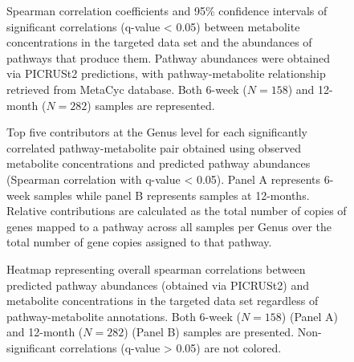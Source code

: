 \begin{figure}[!h]
    \centering
    \caption[Spearman correlation coefficients and 95\% confidence intervals of significant correlations (q-value < 0.05) between metabolite concentrations in the targeted data set and the abundances of pathways that produce them]{Spearman correlation coefficients and 95\% confidence intervals of significant correlations (q-value < 0.05) between metabolite concentrations in the targeted data set and the abundances of pathways that produce them. Pathway abundances were obtained via PICRUSt2 predictions, with pathway-metabolite relationship retrieved from MetaCyc database. Both 6-week ($N = 158$) and 12-month ($N = 282$) samples are represented.}
    \label{fig:b9}
\end{figure}

\begin{figure}[!h]
    \centering
    \caption[Top five contributors at the Genus level for each significantly correlated pathway-metabolite pair obtained using observed metabolite concentrations and predicted pathway abundances (Spearman correlation with q-value < 0.05)]{Top five contributors at the Genus level for each significantly correlated pathway-metabolite pair obtained using observed metabolite concentrations and predicted pathway abundances (Spearman correlation with q-value < 0.05). Panel A represents 6-week samples while panel B represents samples at 12-months. Relative contributions are calculated as the total number of copies of genes mapped to a pathway across all samples per Genus over the total number of gene copies assigned to that pathway.}
    \label{fig:b10}
\end{figure}

\begin{figure}[!h]
    \centering
    \caption[Heatmap representing overall spearman correlations between predicted pathway abundances (obtained via PICRUSt2) and metabolite concentrations in the targeted data set regardless of pathway-metabolite annotations]{Heatmap representing overall spearman correlations between predicted pathway abundances (obtained via PICRUSt2) and metabolite concentrations in the targeted data set regardless of pathway-metabolite annotations. Both 6-week ($N = 158$) (Panel A) and 12-month ($N = 282$) (Panel B) samples are presented. Non-significant correlations (q-value > 0.05) are not colored.}
    \label{fig:b11}
\end{figure}





 
 
